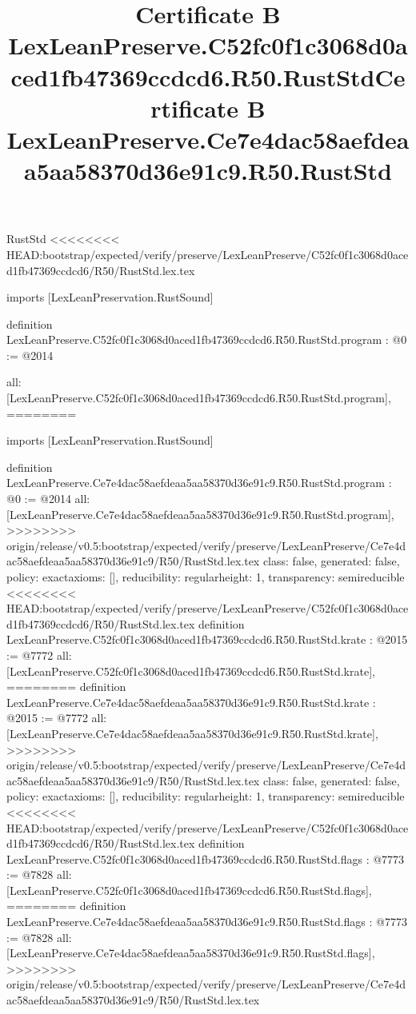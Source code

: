 \begin{lexlean}{RustStd}
<<<<<<<< HEAD:bootstrap/expected/verify/preserve/LexLeanPreserve/C52fc0f1c3068d0aced1fb47369ccdcd6/R50/RustStd.lex.tex
\title{Certificate B LexLeanPreserve.C52fc0f1c3068d0aced1fb47369ccdcd6.R50.RustStd}
\begin{coremodule}
imports [LexLeanPreservation.RustSound]

definition LexLeanPreserve.C52fc0f1c3068d0aced1fb47369ccdcd6.R50.RustStd.program : @0 := @2014 {
  all: [LexLeanPreserve.C52fc0f1c3068d0aced1fb47369ccdcd6.R50.RustStd.program],
========
\title{Certificate B LexLeanPreserve.Ce7e4dac58aefdeaa5aa58370d36e91c9.R50.RustStd}
\begin{coremodule}
imports [LexLeanPreservation.RustSound]

definition LexLeanPreserve.Ce7e4dac58aefdeaa5aa58370d36e91c9.R50.RustStd.program : @0 := @2014 {
  all: [LexLeanPreserve.Ce7e4dac58aefdeaa5aa58370d36e91c9.R50.RustStd.program],
>>>>>>>> origin/release/v0.5:bootstrap/expected/verify/preserve/LexLeanPreserve/Ce7e4dac58aefdeaa5aa58370d36e91c9/R50/RustStd.lex.tex
  class: false,
  generated: false,
  policy: exact{axioms: []},
  reducibility: regular{height: 1},
  transparency: semireducible
}
<<<<<<<< HEAD:bootstrap/expected/verify/preserve/LexLeanPreserve/C52fc0f1c3068d0aced1fb47369ccdcd6/R50/RustStd.lex.tex
definition LexLeanPreserve.C52fc0f1c3068d0aced1fb47369ccdcd6.R50.RustStd.krate : @2015 := @7772 {
  all: [LexLeanPreserve.C52fc0f1c3068d0aced1fb47369ccdcd6.R50.RustStd.krate],
========
definition LexLeanPreserve.Ce7e4dac58aefdeaa5aa58370d36e91c9.R50.RustStd.krate : @2015 := @7772 {
  all: [LexLeanPreserve.Ce7e4dac58aefdeaa5aa58370d36e91c9.R50.RustStd.krate],
>>>>>>>> origin/release/v0.5:bootstrap/expected/verify/preserve/LexLeanPreserve/Ce7e4dac58aefdeaa5aa58370d36e91c9/R50/RustStd.lex.tex
  class: false,
  generated: false,
  policy: exact{axioms: []},
  reducibility: regular{height: 1},
  transparency: semireducible
}
<<<<<<<< HEAD:bootstrap/expected/verify/preserve/LexLeanPreserve/C52fc0f1c3068d0aced1fb47369ccdcd6/R50/RustStd.lex.tex
definition LexLeanPreserve.C52fc0f1c3068d0aced1fb47369ccdcd6.R50.RustStd.flags : @7773 := @7828 {
  all: [LexLeanPreserve.C52fc0f1c3068d0aced1fb47369ccdcd6.R50.RustStd.flags],
========
definition LexLeanPreserve.Ce7e4dac58aefdeaa5aa58370d36e91c9.R50.RustStd.flags : @7773 := @7828 {
  all: [LexLeanPreserve.Ce7e4dac58aefdeaa5aa58370d36e91c9.R50.RustStd.flags],
>>>>>>>> origin/release/v0.5:bootstrap/expected/verify/preserve/LexLeanPreserve/Ce7e4dac58aefdeaa5aa58370d36e91c9/R50/RustStd.lex.tex
}}}
\end{coremodule}}
\end{coremodule}
\end{lexlean}
